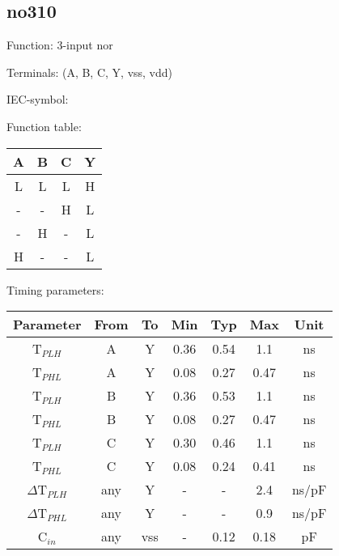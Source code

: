 \subsection{no310}

Function: 3-input nor

Terminals: (A, B, C, Y, vss, vdd)


IEC-symbol:
\begin{figure}[bth]
\end{figure}

\begin{minipage}[t]{0.3\textwidth}
Function table:\\

\begin{tabular}{|c|c|c||c|}
\hline
A	&B	&C	&Y\\
\hline
L	&L	&L	&H\\
-	&-	&H	&L\\
-	&H	&-	&L\\
H	&-	&-	&L\\
\hline
\end{tabular}
\end{minipage}
\hfill
\begin{minipage}[t]{0.6\textwidth}
Timing parameters:\\

\begin{tabular}{|c|cc|ccc|c|}
\hline
Parameter               &From           &To   &Min	&Typ 	&Max    &Unit\\
\hline
T$_{PLH}$               &A     		&Y    &0.36	&0.54  	&1.1    &ns\\
T$_{PHL}$               &A    		&Y    &0.08  	&0.27	&0.47   &ns\\
T$_{PLH}$               &B     		&Y    &0.36  	&0.53  	&1.1  	&ns\\
T$_{PHL}$               &B    		&Y    &0.08	&0.27	&0.47	&ns\\
T$_{PLH}$               &C     		&Y    &0.30	&0.46 	&1.1   	&ns\\
T$_{PHL}$               &C    		&Y    &0.08  	&0.24	&0.41 	&ns\\
\hline
$\Delta$T$_{PLH}$       &any          	&Y    &-	&-	&2.4    &ns/pF\\
$\Delta$T$_{PHL}$       &any           	&Y    &-	&-  	&0.9    &ns/pF\\
\hline
C$_{in}$                &any	    	&vss  &-  	&0.12	&0.18   &pF\\
\hline
\end{tabular}
\end{minipage}
\\

